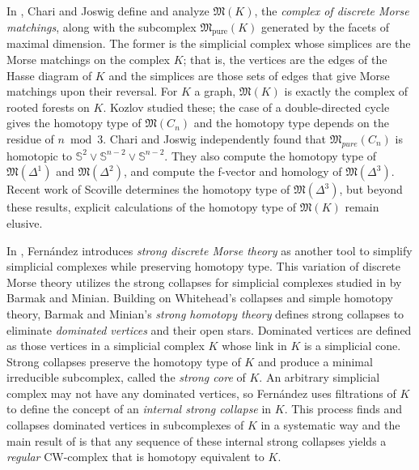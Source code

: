 \documentclass{amsart}
\theoremstyle{definition}
\begin{document}
In \cite{ChariJoswig2005}, Chari and Joswig define and analyze $\mathfrak{M}(K)$, the \textit{complex of discrete Morse matchings}, along with the subcomplex ${\mathfrak M}_\textrm{pure}(K)$ generated by the facets of maximal dimension. The former is the simplicial complex whose simplices are the Morse matchings on the complex $K$; that is, the vertices are the edges of the Hasse diagram of $K$ and the simplices are those sets of edges that give Morse matchings upon their reversal. For $K$ a graph, $\mathfrak{M}(K)$ is exactly the complex of rooted forests on $K$. Kozlov \cite{Kozlov1999} studied these; the case of a double-directed cycle gives the homotopy type of $\mathfrak{M}(C_n)$ and the homotopy type depends on the residue of $n \bmod 3$. Chari and Joswig independently found that $\mathfrak{M}_{pure}(C_n)$ is homotopic to $\mathbb{S}^2\vee\mathbb{S}^{n-2}\vee\mathbb{S}^{n-2}$. They also compute the homotopy type of $\mathfrak{M}(\Delta^1)$ and $\mathfrak{M}(\Delta^2)$, and compute the f-vector and homology of $\mathfrak{M}(\Delta^3)$. Recent work of Scoville \cite{Scoville2026} determines the homotopy type of ${\mathfrak M}(\Delta^3)$, but beyond these results, explicit calculations of the homotopy type of $\mathfrak{M}(K)$ remain elusive.

In \cite{Fernandez2026}, Fern\'andez introduces \textit{strong discrete Morse theory} as another tool to simplify simplicial complexes while preserving homotopy type. This variation of discrete Morse theory utilizes the strong collapses for simplicial complexes studied in \cite{BarmakMinian2009} by Barmak and Minian. Building on Whitehead's collapses and simple homotopy theory, Barmak and Minian's \textit{strong homotopy theory} defines strong collapses to eliminate \textit{dominated vertices} and their open stars. Dominated vertices are defined as those vertices in a simplicial complex $K$ whose link in $K$ is a simplicial cone. Strong collapses preserve the homotopy type of $K$ and produce a minimal irreducible subcomplex, called the \textit{strong core} of $K$. An arbitrary simplicial complex may not have any dominated vertices, so Fern\'andez uses filtrations of $K$ to define the concept of an \textit{internal strong collapse} in $K$. This process finds and collapses dominated vertices in subcomplexes of $K$ in a systematic way and the main result of \cite{Fernandez2026} is that any sequence of these internal strong collapses yields a {\em regular} CW-complex that is homotopy equivalent to $K$.
\end{document}
